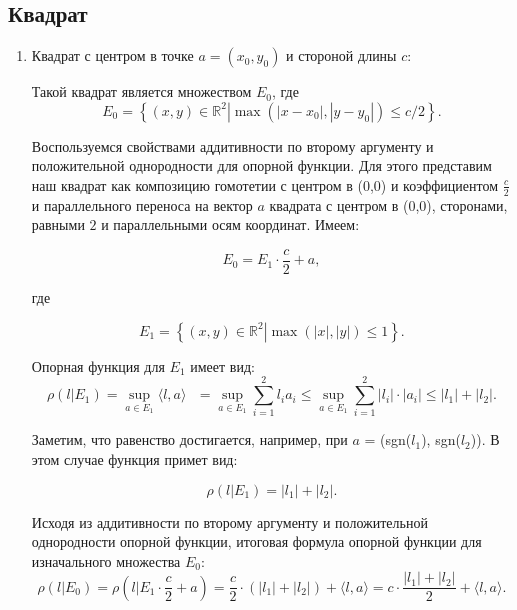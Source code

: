 \documentclass[11pt]{article}
\theoremstyle{definition}
\begin{document}
	\subsection {\bf Квадрат} 
        \begin{enumerate}
            \item Квадрат с центром в точке $a = (x_0, y_0)$ и стороной длины $c$:
            
            Такой квадрат является множеством $E_0$, где 
            \[
            E_0 = \left\{(x, y) \in \left.\mathbb{R}^2 \right|\max(|x-x_0|,|y - y_0|) \leqslant c/2\right\}.
            \] 
            
            Воспользуемся свойствами аддитивности по второму аргументу и положительной однородности для опорной функции. Для этого представим наш квадрат как композицию гомотетии с центром в (0,0) и коэффициентом $\frac{c}{2}$ и параллельного переноса на вектор $a$ квадрата с центром в (0,0), сторонами, равными $2$ и параллельными осям координат. Имеем:
            
            \[
            E_0 = E_1\cdot  \frac{c}{2} + a,
            \]
            
            где 
            
            \[
            E_1 = \left\{(x, y) \in \left. \mathbb{R}^2 \right| \max(|x|,|y|) \leqslant 1\right\}.
            \] 
            
            Опорная функция для $E_1$ имеет вид:
            \[\rho( l \left| E_1\right.) = \sup_{a \in E_1}\langle l, a\rangle  \text{ } = \sup_{a \in E_1} \sum_{i=1}^2 l_i a_i\leqslant \sup_{a \in E_1}\sum_{i = 1}^2 |l_i|\cdot |a_i| \leqslant |l_1| + |l_2|.
            \]
            

            Заметим, что равенство достигается, например, при $a$ = (sgn($l_1$), sgn($l_2$)). В этом случае функция примет вид:
            
            \[
            \rho( l \left| E_1\right.) = |l_1| + |l_2|.
            \]
            
            Исходя из аддитивности по второму аргументу и положительной однородности опорной функции, итоговая формула опорной функции для изначального множества $E_0$:
            \[
            \rho( l \left| E_0\right.) = \rho( l \left| E_1\cdot \right. \frac{c}{2} + a) = \frac{c}{2}\cdot (|l_1| + |l_2|) + \langle l, a\rangle  = c\cdot \frac{|l_1| + |l_2|}{2} + \langle l, a\rangle.
            \]
       \end{enumerate}
    
\end{document}
